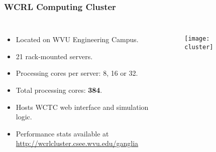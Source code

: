 \begin{frame}
\frametitle{WCRL Computing Cluster}

\begin{columns}[c]

\begin{itemize}
\item Located on WVU Engineering Campus.
\item 21 rack-mounted servers.
\item Processing cores per server: 8, 16 or 32.
\item Total processing cores: \textbf{384}.
\item Hosts WCTC web interface and simulation logic.
\item Performance stats available at
\\ \url{http://wcrlcluster.csee.wvu.edu/ganglia}
\end{itemize}

  \begin{figure}
    \centering
    \texttt{[image: cluster]}
  \end{figure}


\end{columns}

\end{frame}
